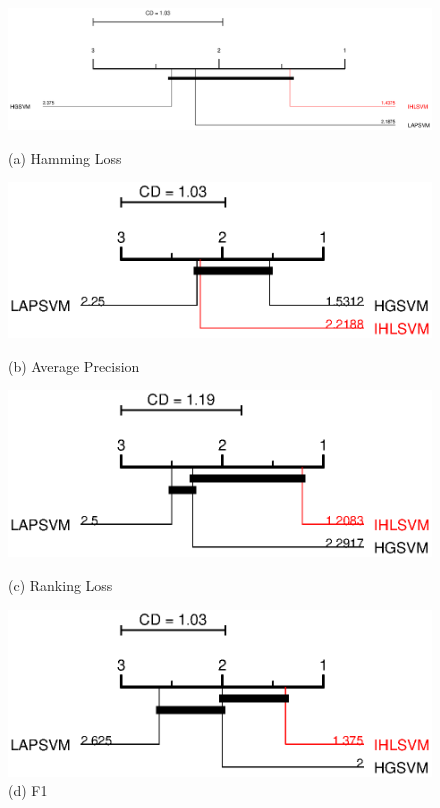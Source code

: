 \documentclass[12pt,a4paper,oneside,english]{report}
\begin{document}
   \begin{figure}[t!] %
    \centering
    \begin{minipage}[t]{0.5\textwidth}
        \centering
        \includegraphics[width=1.3\linewidth]{Figures/chp4/HL_IHLSVM.eps}
        \caption*{(a) Hamming Loss}
    \end{minipage}%
    \begin{minipage}[t]{0.5\textwidth}
        \centering
        \includegraphics[width=0.9\linewidth]{Figures/chp4/AP_IHLSVM.eps}
        \caption*{(b) Average Precision}
        \label{figap_IHLSVM}
    \end{minipage}
    \vspace{0.5cm} %

    \begin{minipage}[t]{0.5\textwidth}
        \centering
        \includegraphics[width=0.9\linewidth]{Figures/chp4/RL_IHLSVM.eps}
        \caption*{(c) Ranking Loss}
        \label{figrl_IHLSVM}
    \end{minipage}%
    \begin{minipage}[t]{0.5\textwidth}
        \centering
        \includegraphics[width=0.9\linewidth]{Figures/chp4/F1_IHLSVM.eps}
        \caption*{(d) F1}
        \label{figcov_IHLSVM}
    \end{minipage}
    \vspace{0.5cm}


\end{figure}
\end{document}
